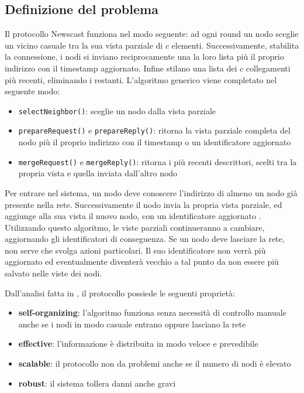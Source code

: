 \subsection{Definizione del problema}
Il protocollo Newscast funziona nel modo seguente: ad ogni round un nodo sceglie un vicino casuale tra la sua vista parziale di $c$ elementi. Successivamente, stabilita la connessione, i nodi si inviano reciprocamente una la loro lista più il proprio indirizzo con il timestamp aggiornato. Infine stilano una lista dei $c$ collegamenti più recenti, eliminando i restanti.
L’algoritmo generico viene completato nel seguente modo:
\begin{itemize}
    \item \texttt{selectNeighbor()}: sceglie un nodo dalla vista parziale
    \item \texttt{prepareRequest()} e \texttt{prepareReply()}: ritorna la vista parziale completa del nodo più il proprio indirizzo con il timestamp o un identificatore aggiornato
    \item \texttt{mergeRequest()} e \texttt{mergeReply()}: ritorna i più recenti descrittori, scelti tra la propria vista e quella inviata dall’altro nodo
\end{itemize}
Per entrare nel sistema, un nodo deve conoscere l'indirizzo di almeno un nodo già presente nella rete. Successivamente il nodo invia la propria vista parziale, ed aggiunge alla sua vista il nuovo nodo, con un identificatore aggiornato \cite{montresor}. Utilizzando questo algoritmo, le viste parziali continueranno a cambiare, aggiornando gli identificatori di conseguenza. Se un nodo deve lasciare la rete, non serve che svolga azioni particolari. Il suo identificatore non verrà più aggiornato ed eventualmente diventerà vecchio a tal punto da non essere più salvato nelle viste dei nodi.

Dall'analisi fatta in \cite{membership}, il protocollo possiede le seguenti proprietà:
\begin{itemize}
    \item \textbf{self-organizing}: l'algoritmo funziona senza necessità di controllo manuale anche se i nodi in modo casuale entrano oppure lasciano la rete
    \item \textbf{effective}: l'informazione è distribuita in modo veloce e prevedibile
    \item \textbf{scalable}: il protocollo non da problemi anche se il numero di nodi è elevato
    \item \textbf{robust}: il sistema tollera danni anche gravi
\end{itemize} 

